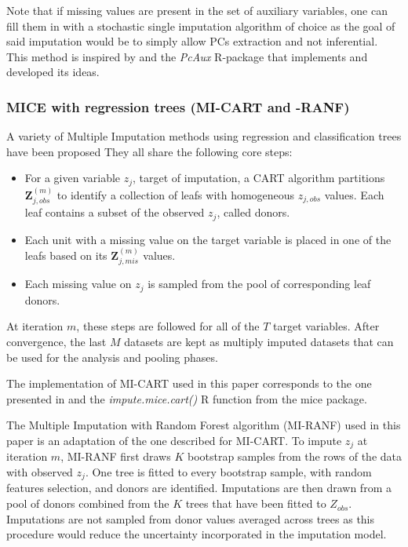 	Note that if missing values are present in the set of auxiliary variables, one can fill them in with a 
	stochastic single imputation algorithm of choice as the goal of said imputation would be to simply
	allow PCs extraction and not inferential. This method is inspired by \cite{howardEtAl:2015} and the
	\emph{PcAux} R-package that implements and developed its ideas.
	
\subsubsection{MICE with regression trees (MI-CART and -RANF)}
	A variety of Multiple Imputation methods using regression and classification trees have been proposed
	\citep{reiter:2005, burgetteReiter:2010, shahEtAl:2014}
	They all share the following core steps:

	\begin{itemize}

	\item For a given variable $z_j$, target of imputation, a CART algorithm partitions 
		$\bm{Z}_{j, obs}^{(m)}$ to identify a collection of leafs with homogeneous 
		$z_{j,obs}$ values. Each leaf contains a subset of the observed $z_j$, called donors.

	\item Each unit with a missing value on the target variable is placed in one of the leafs based on its 
		$\bm{Z}_{j, mis}^{(m)}$ values.

	\item Each missing value on $z_{j}$ is sampled from the pool of corresponding leaf donors.

	\end{itemize}

	At iteration $m$, these steps are followed for all of the $T$ target variables. 
	After convergence, the last $M$ datasets are kept as multiply imputed datasets that can be used for the 
	analysis and pooling phases.

	The implementation of MI-CART used in this paper corresponds to the one presented in 
	\cite[p. 95, algorithm 1]{dooveEtAl:2014}
	and the \emph{impute.mice.cart()} R function from the mice package.

	The Multiple Imputation with Random Forest algorithm (MI-RANF) used in this paper is an adaptation 
	of the one described for MI-CART. 
	To impute $z_j$ at iteration $m$, MI-RANF first draws $K$ bootstrap samples from the 
	rows of the data with observed $z_j$. 
	One tree is fitted to every bootstrap sample, with random features selection, and donors are identified. 
	Imputations are then drawn from a pool of donors combined from the $K$ trees that have been fitted to $Z_{obs}$. 
	Imputations are not sampled from donor values averaged across trees as this procedure would reduce the 
	uncertainty incorporated in the imputation model.

